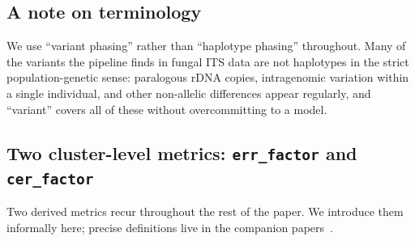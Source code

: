 \documentclass[11pt]{article}
\begin{document}
\subsection{A note on terminology}

We use ``variant phasing'' rather than ``haplotype phasing'' throughout. Many
of the variants the pipeline finds in fungal ITS data are not haplotypes in the
strict population-genetic sense: paralogous rDNA copies, intragenomic variation
within a single individual, and other non-allelic differences appear regularly,
and ``variant'' covers all of these without overcommitting to a model.

\subsection{Two cluster-level metrics: \texttt{err\_factor} and \texttt{cer\_factor}}
\label{sec:metrics}

Two derived metrics recur throughout the rest of the paper. We introduce them
informally here; precise definitions live in the companion
papers~\cite{cer_paper,cer_in_practice}.
\end{document}
